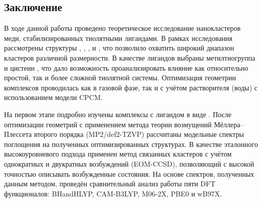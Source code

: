 \documentclass[a4paper,12pt]{article}
\begin{document}
\begin{onehalfspace}
	\newpage
	
	\section*{Заключение}
	
%	
%	

	В ходе данной работы проведено теоретическое исследование нанокластеров меди, стабилизированных тиолятными лигандами. В рамках исследования рассмотрены структуры , , ,  и , что позволило охватить широкий диапазон кластеров различной размерности. В качестве лигандов выбраны метилтиогруппа  и цистеин , что дало возможность проанализировать влияние как относительно простой, так и более сложной тиолятной системы. Оптимизация геометрии комплексов проводилась как в газовой фазе, так и с учётом растворителя (воды) с использованием модели CPCM.

	На первом этапе подробно изучены комплексы с лигандом  в виде . После оптимизации геометрий с применением метода теории возмущений Мёллера–Плессета второго порядка (MP2/def2-TZVP) рассчитаны модельные спектры поглощения на полученных оптимизированных структурах. В качестве эталонного высокоуровневого подхода применен метод связанных кластеров с учётом однократных и двукратных возбуждений (EOM-CCSD), позволяющий с высокой точностью описывать возбужденные состояния. На основе спектров, полученных данным методом, проведён сравнительный анализ работы пяти DFT функционалов: BHandHLYP, CAM-B3LYP, M06-2X, PBE0 и wB97X.


\end{onehalfspace}
\end{document}
